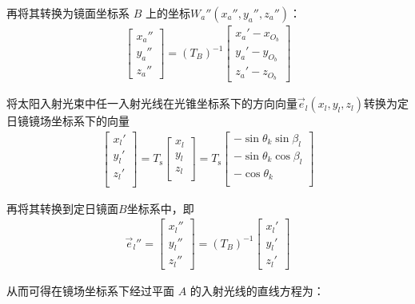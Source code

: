 \documentclass[../main.tex]{subfiles}
\begin{document}
\par 再将其转换为镜面坐标系 \( B \) 上的坐标$W_a''(x_a'',y_a'',z_a'')$：
\begin{align}\label{1.31}
 \begin{bmatrix}
x_a'' \\
y_a'' \\
z_a''
\end{bmatrix}
= (T_B)^{-1} \begin{bmatrix}
x_a' - x_{O_b} \\
y_a' - y_{O_b} \\
z_a' - z_{O_b}
\end{bmatrix}
\end{align}
\par 将太阳入射光束中任一入射光线在光锥坐标系下的方向向量$\vec{e}_l(x_l, y_l, z_l)$转换为定日镜镜场坐标系下的向量
\begin{align}    \label{1.32}
\left[ \begin{matrix}
x_l'\\
y_l'\\
z_l'\\
\end{matrix} \right] =T_{\text{s}}\left[ \begin{matrix}
x_l\\
y_l\\
z_l\\
\end{matrix} \right]
=T_{\text{s}}\left[ \begin{matrix}
-\sin \theta_k \sin \beta_l\\
-\sin \theta_k \cos \beta_l\\
-\cos\theta_k\\
\end{matrix} \right]
\end{align}
\par 再将其转换到定日镜面$B$坐标系中，即
\begin{align} \label{1.33}
  \vec{e}_l'' = \begin{bmatrix}
x_l'' \\
y_l'' \\
z_l''
\end{bmatrix} = ({T_B})^{-1} \begin{bmatrix}
x_l' \\
y_l' \\
z_l'
\end{bmatrix}
\end{align}
\par  从而可得在镜场坐标系下经过平面 $A$ 的入射光线的直线方程为：
\end{document}
